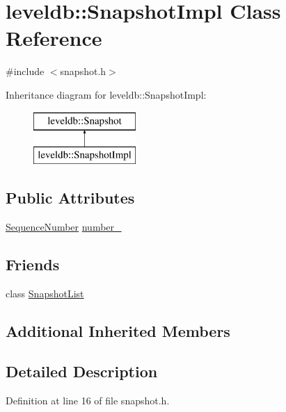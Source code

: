 \hypertarget{classleveldb_1_1_snapshot_impl}{}\section{leveldb\+:\+:Snapshot\+Impl Class Reference}
\label{classleveldb_1_1_snapshot_impl}


{\ttfamily \#include $<$snapshot.\+h$>$}

Inheritance diagram for leveldb\+:\+:Snapshot\+Impl\+:\begin{figure}[H]
\begin{center}
\leavevmode
\includegraphics[height=2.000000cm]{classleveldb_1_1_snapshot_impl}
\end{center}
\end{figure}
\subsection*{Public Attributes}
\begin{DoxyCompactItemize}
\item 
\hyperlink{namespaceleveldb_a5481ededd221c36d652c371249f869fa}{Sequence\+Number} \hyperlink{classleveldb_1_1_snapshot_impl_aa31dca969679d05d17c4c0eb1443a96e}{number\+\_\+}
\end{DoxyCompactItemize}
\subsection*{Friends}
\begin{DoxyCompactItemize}
\item 
class \hyperlink{classleveldb_1_1_snapshot_impl_abe14b2fb5e32159324c619e1a42327a0}{Snapshot\+List}
\end{DoxyCompactItemize}
\subsection*{Additional Inherited Members}


\subsection{Detailed Description}


Definition at line 16 of file snapshot.\+h.



